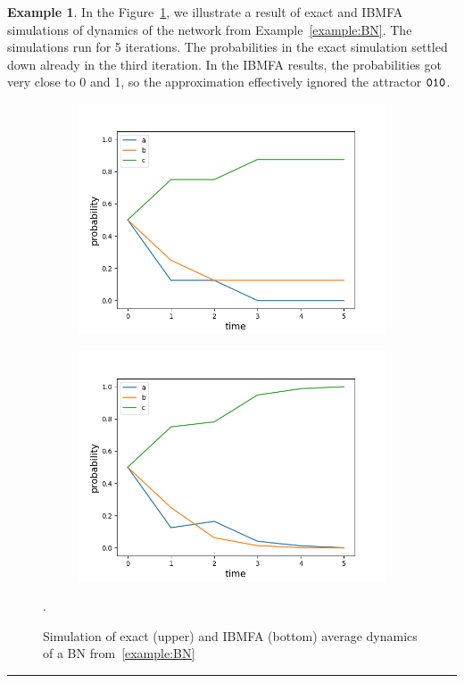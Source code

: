 \documentclass[
	digital, oneside, nosansbold, nocolorbold, nolot, nolof
]{fithesis4}
\theoremstyle{definition}
\theoremstyle{definition}
\newtheorem{example}{Example}
\newenvironment{lexample}
    {\begin{example}}
    {\par\hspace{\stretch{1}}\rule{0.2\textwidth}{0.01ex}\hspace{\stretch{1}}
     \par\end{example}}
\begin{document}
\begin{lexample}
In the Figure~\ref{fig:simulations}, we illustrate a result of exact and IBMFA
simulations of dynamics of the network from Example~\ref{example:BN}.
The simulations run for 5 iterations. The probabilities in the exact
simulation settled down already in the third iteration. In the IBMFA results,
the probabilities got very close to 0 and 1, so the approximation effectively
ignored the attractor $\mathtt{010}$.
\begin{figure}[!ht]
\centering
\begin{subfigure}{0.85\textwidth}
    \centering
    \includegraphics[width=\columnwidth]{example_brute_force.png}
\end{subfigure}
\begin{subfigure}{0.85\textwidth}
    \centering
    \includegraphics[width=\columnwidth]{example_ibmfa.png}
\end{subfigure}
\caption{Simulation of exact (upper) and IBMFA (bottom) average dynamics
    of a BN from~\ref{example:BN}}.
\label{fig:simulations}
\end{figure}
\end{lexample}
\end{document}
